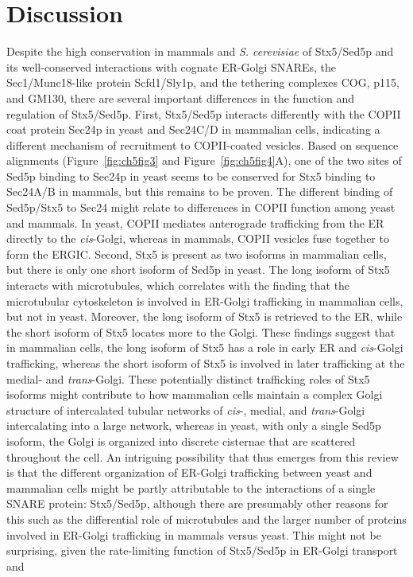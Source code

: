 \clearpage
\section{Discussion}
Despite the high conservation in mammals and \emph{S. cerevisiae} of Stx5/Sed5p and its well-conserved interactions with cognate ER-Golgi SNAREs, the Sec1/Munc18-like protein Scfd1/Sly1p, and the tethering complexes COG, p115, and GM130, there are several important differences in the function and regulation of Stx5/Sed5p. First, Stx5/Sed5p interacts differently with the COPII coat protein Sec24p in yeast and Sec24C/D in mammalian cells\cite{adolf_sec24c/d-isoformspecific_2016,mancias_structural_2008,peng_sly1_2002,mossessova_snare_2003}, indicating a different mechanism of recruitment to COPII-coated vesicles. Based on sequence alignments (Figure~\ref{fig:ch5fig3} and Figure~\ref{fig:ch5fig4}A), one of the two sites of Sed5p binding to Sec24p in yeast seems to be conserved for Stx5 binding to Sec24A/B in mammals, but this remains to be proven. The different binding of Sed5p/Stx5 to Sec24 might relate to differences in COPII function among yeast and mammals. In yeast, COPII mediates anterograde trafficking from the ER directly to the \emph{cis}-Golgi\cite{barlowe_copii_1994}, whereas in mammals, COPII vesicles fuse together to form the ERGIC\cite{cottam_retrograde_2012,papanikou_yeast_2009}. Second, Stx5 is present as two isoforms in mammalian cells, but there is only one short isoform of Sed5p in yeast. The long isoform of Stx5 interacts with microtubules\cite{miyazaki_contribution_2012}, which correlates with the finding that the microtubular cytoskeleton is involved in ER-Golgi trafficking in mammalian cells, but not in yeast\cite{cottam_retrograde_2012,papanikou_yeast_2009,jackson_mechanisms_2009}. Moreover, the long isoform of Stx5 is retrieved to the ER, while the short isoform of Stx5 locates more to the Golgi\cite{hui_isoform_1997,suga_syntaxin_2009,dominguez_gp25l/emp24/p24_1998}. These findings suggest that in mammalian cells, the long isoform of Stx5 has a role in early ER and \emph{cis}-Golgi trafficking, whereas the short isoform of Stx5 is involved in later trafficking at the medial- and \emph{trans}-Golgi. These potentially distinct trafficking roles of Stx5 isoforms might contribute to how mammalian cells maintain a complex Golgi structure of intercalated tubular networks of \emph{cis}-, medial, and \emph{trans}-Golgi intercalating into a large network, whereas in yeast, with only a single Sed5p isoform, the Golgi is organized into discrete cisternae that are scattered throughout the cell\cite{cottam_retrograde_2012,papanikou_yeast_2009,jackson_mechanisms_2009}. An intriguing possibility that thus emerges from this review is that the different organization of ER-Golgi trafficking between yeast and mammalian cells might be partly attributable to the interactions of a single SNARE protein: Stx5/Sed5p, although there are presumably other reasons for this such as the differential role of microtubules and the larger number of  proteins involved in ER-Golgi trafficking in mammals versus yeast. This might not be surprising, given the rate-limiting function of Stx5/Sed5p in ER-Golgi transport\cite{van_zyl_overexpression_2016} and 
